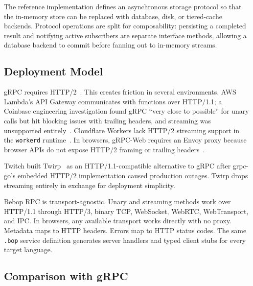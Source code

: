 \documentclass[10pt,onecolumn]{article}
\begin{document}
The reference implementation defines an asynchronous storage protocol so that the in-memory store can be replaced with database, disk, or tiered-cache backends. Protocol operations are split for composability: persisting a completed result and notifying active subscribers are separate interface methods, allowing a database backend to commit before fanning out to in-memory streams.

\subsection{Deployment Model}

gRPC requires HTTP/2~\cite{grpc-http2-spec}. This creates friction in several environments. AWS Lambda's API Gateway communicates with functions over HTTP/1.1; a Coinbase engineering investigation found gRPC ``very close to possible'' for unary calls but hit blocking issues with trailing headers, and streaming was unsupported entirely~\cite{henry-grpc-lambda}. Cloudflare Workers lack HTTP/2 streaming support in the \texttt{workerd} runtime~\cite{cloudflare-workerd-grpc}. In browsers, gRPC-Web requires an Envoy proxy because browser APIs do not expose HTTP/2 framing or trailing headers~\cite{brandhorst-grpc-web}.

Twitch built Twirp~\cite{nelson-twirp} as an HTTP/1.1-compatible alternative to gRPC after grpc-go's embedded HTTP/2 implementation caused production outages. Twirp drops streaming entirely in exchange for deployment simplicity.

Bebop RPC is transport-agnostic. Unary and streaming methods work over HTTP/1.1 through HTTP/3, binary TCP, WebSocket, WebRTC, WebTransport, and IPC. In browsers, any available transport works directly with no proxy. Metadata maps to HTTP headers. Errors map to HTTP status codes. The same \texttt{.bop} service definition generates server handlers and typed client stubs for every target language.

\subsection{Comparison with gRPC}
\end{document}
